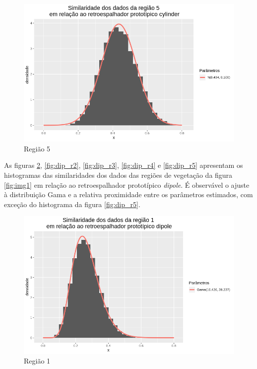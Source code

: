 \documentclass[12pt]{article}
\begin{document}
\begin{figure}[!h]
    \centering
    \vspace{0.1\linewidth}
    \includegraphics[width = \linewidth]{../../Images/Report_18_12_20/cy_region5.png}
    \caption{Região 5}
    \label{fig:cy_r5}
\end{figure}

As figuras \ref{fig:dip_r1}, \ref{fig:dip_r2}, \ref{fig:dip_r3}, \ref{fig:dip_r4} e \ref{fig:dip_r5} apresentam os histogramas das similaridades dos dados das regiões de vegetação da figura \ref{fig:img1} em relação ao retroespalhador prototípico \textit{dipole}. É observável o ajuste à distribuição Gama e a relativa proximidade entre os parâmetros estimados, com exceção do histograma da figura \ref{fig:dip_r5}.

\begin{figure}[!h]
    \centering
    \includegraphics[width = \linewidth]{../../Images/Report_18_12_20/dip_region1.png}
    \caption{Região 1}
    \label{fig:dip_r1}
\end{figure}
\end{document}
